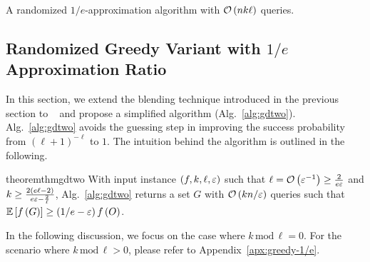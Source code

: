 \begin{algorithm}[ht]
    \caption{A randomized $1/e$-approximation algorithm with $\mathcal O \left(  nk\ell  \right)$ queries. }
    \label{alg:gdtwo}
\end{algorithm}
\subsection{Randomized Greedy Variant with $1/e$ Approximation Ratio}
\label{sec:greedy-1/e}
In this section, we extend the blending technique introduced in the previous section 
to \itg~\citep{DBLP:conf/kdd/ChenK23} 
and propose a simplified algorithm (Alg.~\ref{alg:gdtwo}).
Alg.~\ref{alg:gdtwo} avoids the guessing step in \itg
improving the success probability from $(\ell+1)^{-\ell}$ to $1$.
The intuition behind the algorithm is outlined in the following.
\begin{restatable}{theorem}{thmgdtwo}\label{thm:gdtwo}
With input instance $(f, k, \ell, \varepsilon)$
such that $\ell =\mathcal O \left( \varepsilon^{-1} \right) \ge \frac{2}{e\varepsilon}$ and $k \ge \frac{2(e\ell-2)}{e\varepsilon-\frac{2}{\ell}}$,
Alg.~\ref{alg:gdtwo} returns a set $G$ with $\mathcal O \left( kn/\varepsilon \right)$ queries
such that $\mathbb{E}\left[ f \left( G \right) \right] \ge \left(1/e-\varepsilon\right) f \left( O \right)$.
\end{restatable}
In the following discussion, we focus on the case where $k\, \text{mod}\,\ell = 0$.
For the scenario where $k \, \text{mod}\,\ell > 0$, please refer to Appendix~\ref{apx:greedy-1/e}.


